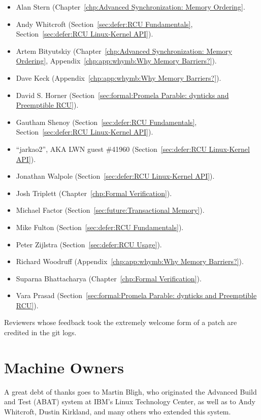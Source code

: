 \begin{itemize}
\item	Alan Stern (Chapter~\ref{chp:Advanced Synchronization: Memory Ordering}.
\item	Andy Whitcroft (Section~\ref{sec:defer:RCU Fundamentals},
	Section~\ref{sec:defer:RCU Linux-Kernel API}).
\item	Artem Bityutskiy (Chapter~\ref{chp:Advanced Synchronization: Memory Ordering},
	Appendix~\ref{chp:app:whymb:Why Memory Barriers?}).
\item	Dave Keck (Appendix~\ref{chp:app:whymb:Why Memory Barriers?}).
\item	David S. Horner
	(Section~\ref{sec:formal:Promela Parable: dynticks and Preemptible RCU}).
\item	Gautham Shenoy (Section~\ref{sec:defer:RCU Fundamentals},
	Section~\ref{sec:defer:RCU Linux-Kernel API}).
\item	``jarkao2'', AKA LWN guest \#41960 (Section~\ref{sec:defer:RCU Linux-Kernel API}).
\item	Jonathan Walpole (Section~\ref{sec:defer:RCU Linux-Kernel API}).
\item	Josh Triplett (Chapter~\ref{chp:Formal Verification}).
\item	Michael Factor (Section~\ref{sec:future:Transactional Memory}).
\item	Mike Fulton (Section~\ref{sec:defer:RCU Fundamentals}).
\item	Peter Zijlstra
	(Section~\ref{sec:defer:RCU Usage}). %
\item	Richard Woodruff (Appendix~\ref{chp:app:whymb:Why Memory Barriers?}).
\item	Suparna Bhattacharya (Chapter~\ref{chp:Formal Verification}).
\item	Vara Prasad
	(Section~\ref{sec:formal:Promela Parable: dynticks and Preemptible RCU}).
\end{itemize}

Reviewers whose feedback took the extremely welcome form of a patch
are credited in the git logs.

\section{Machine Owners}

A great debt of thanks goes to Martin Bligh, who originated the
Advanced Build and Test (ABAT) system at IBM's Linux Technology
Center, as well as to Andy Whitcroft, Dustin Kirkland, and many
others who extended this system.

